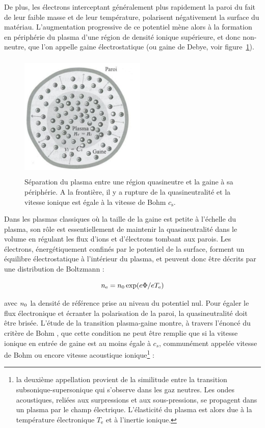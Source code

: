 \begin{refsection}
De plus, les électrons interceptant généralement
plus rapidement la paroi du fait de leur faible masse et de leur température,
polarisent négativement la surface du matériau.
L'augmentation progressive de ce potentiel mène alors à la formation en
périphérie du plasma d'une région de densité ionique supérieure, et donc
non-neutre, que l'on appelle gaine électrostatique (ou gaine de Debye, voir
figure~\ref{1-gaine1}).

\begin{figure}[htbp]
\centering
\includegraphics[height=60mm,width=60mm]{figures/1-sheath.jpg}{\caption{Séparation
du plasma entre une région quasineutre et la gaine à sa
périphérie. A la frontière, il y a rupture de la quasineutralité et la vitesse
ionique est égale à la vitesse de Bohm
$c_\text{s}$\parencite{Rax}.}\label{1-gaine1}}
\end{figure}

Dans les plasmas classiques où la taille de la gaine est petite
à l'échelle du plasma, son rôle est essentiellement de
maintenir la quasineutralité dans le volume en régulant les flux d'ions et
d'électrons tombant aux parois. Les électrons, énergétiquement confinés par le
potentiel de la surface, forment un équilibre électrostatique à l'intérieur du
plasma, et peuvent donc être décrits par une distribution de Boltzmann :

\begin{equation}
	n_\text{e}=n{_{0}}\exp(e\Phi/eT_\text{e})
\end{equation}

avec $n{_{0}}$ la densité de référence prise au niveau du potentiel nul.
Pour égaler le flux électronique et écranter la polarisation de la paroi, la
quasineutralité doit être brisée. L'étude de la transition plasma-gaine montre,
à travers l'énoncé du critère de Bohm \parencite{Stangeby}, que
cette condition ne peut être remplie que si la vitesse ionique en entrée de
gaine est au moins égale à $c_s$, communément appelée vitesse de Bohm ou encore
vitesse acoustique ionique\footnote{la deuxième appellation provient de la similitude entre la
transition subsonique-supersonique qui s'observe dans les gaz neutres. Les
ondes acoustiques, reliées aux surpressions et aux sous-pressions, se propagent
dans un plasma par le champ électrique. L'élasticité du plasma est alors due à
la température électronique $T_\text{e}$ et à l'inertie ionique.} :


\end{refsection}
